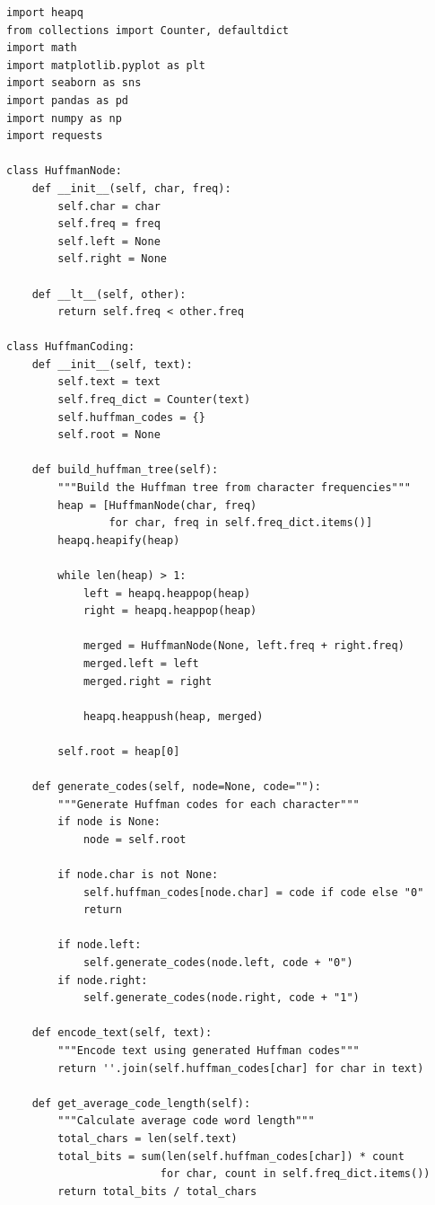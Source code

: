 \documentclass[11pt]{article}
\begin{document}
\begin{lstlisting}
import heapq
from collections import Counter, defaultdict
import math
import matplotlib.pyplot as plt
import seaborn as sns
import pandas as pd
import numpy as np
import requests

class HuffmanNode:
    def __init__(self, char, freq):
        self.char = char
        self.freq = freq
        self.left = None
        self.right = None
    
    def __lt__(self, other):
        return self.freq < other.freq

class HuffmanCoding:
    def __init__(self, text):
        self.text = text
        self.freq_dict = Counter(text)
        self.huffman_codes = {}
        self.root = None
    
    def build_huffman_tree(self):
        """Build the Huffman tree from character frequencies"""
        heap = [HuffmanNode(char, freq) 
                for char, freq in self.freq_dict.items()]
        heapq.heapify(heap)
        
        while len(heap) > 1:
            left = heapq.heappop(heap)
            right = heapq.heappop(heap)
            
            merged = HuffmanNode(None, left.freq + right.freq)
            merged.left = left
            merged.right = right
            
            heapq.heappush(heap, merged)
        
        self.root = heap[0]
    
    def generate_codes(self, node=None, code=""):
        """Generate Huffman codes for each character"""
        if node is None:
            node = self.root
        
        if node.char is not None:
            self.huffman_codes[node.char] = code if code else "0"
            return
        
        if node.left:
            self.generate_codes(node.left, code + "0")
        if node.right:
            self.generate_codes(node.right, code + "1")
    
    def encode_text(self, text):
        """Encode text using generated Huffman codes"""
        return ''.join(self.huffman_codes[char] for char in text)
    
    def get_average_code_length(self):
        """Calculate average code word length"""
        total_chars = len(self.text)
        total_bits = sum(len(self.huffman_codes[char]) * count 
                        for char, count in self.freq_dict.items())
        return total_bits / total_chars


\end{lstlisting}
\end{document}
